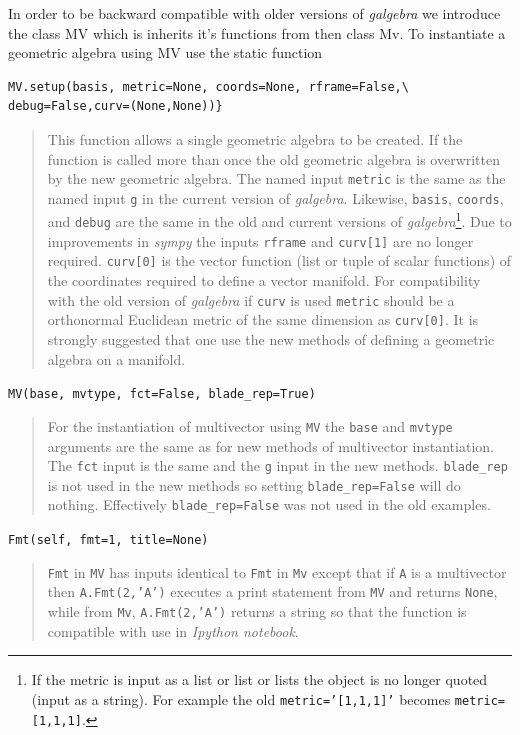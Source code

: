 \documentclass[12pt]{report}
\newcommand{\T}[1]{\texttt{#1}}
\begin{document}
In order to be backward compatible with older versions of \emph{galgebra} we introduce the class MV which is inherits it's functions from
then class Mv. To instantiate a geometric algebra using MV use the static function
\begin{lstlisting}
MV.setup(basis, metric=None, coords=None, rframe=False,\
debug=False,curv=(None,None))}
\end{lstlisting}
\vspace{-6pt}
\begin{quote}
   This function allows a single geometric algebra to be created.  If the function is called more than once the old geometric algebra
   is overwritten by the new geometric algebra.  The named input \T{metric} is the same as the named input \T{g} in the current
   version of \emph{galgebra}.  Likewise, \T{basis}, \T{coords}, and \T{debug} are the same in the old and current versions of
   \emph{galgebra}\footnote{If the metric is input as a list or list or lists the object is no longer quoted (input as a string).
   For example the old \T{metric='[1,1,1]'} becomes \T{metric=[1,1,1]}.}.  Due to improvements in \emph{sympy} the inputs 
   \T{rframe} and \T{curv[1]} are no longer required.  \T{curv[0]} is
   the vector function (list or tuple of scalar functions) of the coordinates required to define a vector manifold.  For
   compatibility with the old version of \emph{galgebra} if \T{curv} is used \T{metric} should be a orthonormal Euclidean
   metric of the same dimension as \T{curv[0]}.  It is strongly suggested that one use the new methods of defining a geometric algebra
   on a manifold.
\end{quote}

\T{MV(base, mvtype, fct=False, blade\_rep=True)}

\begin{quote}
    For the instantiation of multivector using \T{MV} the \T{base} and \T{mvtype} arguments are the same as for new methods of
    multivector instantiation.  The \T{fct} input is the same and the \T{g} input in the new methods.  \T{blade\_rep} is not used
    in the new methods so setting \T{blade\_rep=False} will do nothing.  Effectively \T{blade\_rep=False} was not used in the old
    examples.
\end{quote}

\T{Fmt(self, fmt=1, title=None)}

\begin{quote}
    \T{Fmt} in \T{MV} has inputs identical to \T{Fmt} in \T{Mv} except that if \T{A} is a multivector then \T{A.Fmt(2,'A')}
    executes a print statement from \T{MV} and returns \T{None}, while from \T{Mv}, \T{A.Fmt(2,'A')} returns a string so that
    the function is compatible with use in \emph{Ipython notebook}.
\end{quote}
\end{document}
